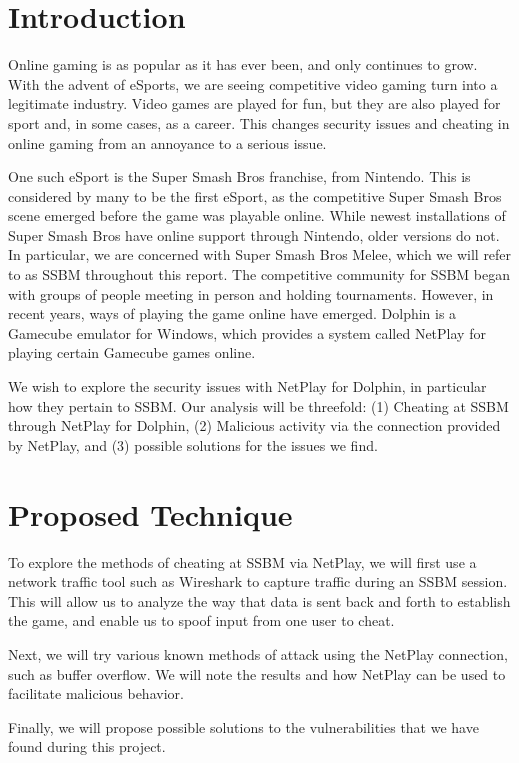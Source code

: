 \documentclass[conference]{IEEEtran}
\begin{document}
\section{Introduction}
Online gaming is as popular as it has ever been, and only continues to grow. 
With the advent of eSports, we are seeing competitive video gaming turn into a legitimate industry. Video games are played for fun, but they are also played for sport and, in some cases, as a career. This changes security issues and cheating in online gaming from an annoyance to a serious issue. 
	
One such eSport is the Super Smash Bros franchise, from Nintendo.
This is considered by many to be the first eSport, as the competitive Super Smash Bros scene emerged before the game was playable online.
While newest installations of Super Smash Bros have online support through Nintendo, older versions do not.
In particular, we are concerned with Super Smash Bros Melee, which we will refer to as SSBM throughout this report.
The competitive community for SSBM began with groups of people meeting in person and holding tournaments.
However, in recent years, ways of playing the game online have emerged.
Dolphin is a Gamecube emulator for Windows, which provides a system called NetPlay for playing certain Gamecube games online.

We wish to explore the security issues with NetPlay for Dolphin, in particular how they pertain to SSBM. 
Our analysis will be threefold: (1) Cheating at SSBM through NetPlay for Dolphin, (2) Malicious activity via the connection provided by NetPlay, and (3) possible solutions for the issues we find.

\section{Proposed Technique}
To explore the methods of cheating at SSBM via NetPlay, we will first use a network traffic tool such as Wireshark to capture traffic during an SSBM session. This will allow us to analyze the way that data is sent back and forth to establish the game, and enable us to spoof input from one user to cheat. 
	
Next, we will try various known methods of attack using the NetPlay connection, such as buffer overflow. We will note the results and how NetPlay can be used to facilitate malicious behavior.
	
Finally, we will propose possible solutions to the vulnerabilities that we have found during this project.
\end{document}
